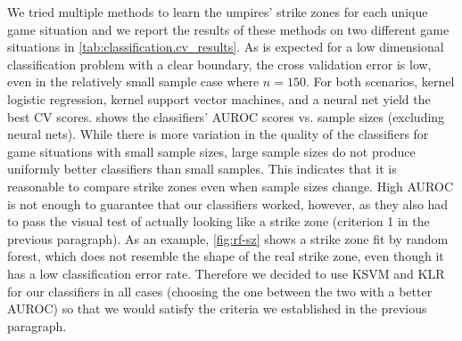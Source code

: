 \documentclass[letterpaper,12pt]{article}
\begin{document}
We tried multiple methods to learn the umpires' strike zones for each unique game situation and we report the results of these methods on two different game situations in \cref{tab:classification.cv_results}.
As is expected for a low dimensional classification problem with a clear boundary, the cross validation error is low, even in the relatively small sample case where $n=150$.
For both scenarios, kernel logistic regression, kernel support vector machines, and a neural net yield the best CV scores. 
 shows the classifiers' AUROC scores vs. sample sizes (excluding neural nets). While there is more variation in the quality of the classifiers for game situations with small sample sizes, large sample sizes do not produce uniformly better classifiers than small samples. This indicates that it is reasonable to compare strike zones even when sample sizes change.
High AUROC is not enough to guarantee that our classifiers worked, however, as they also had to pass the visual test of actually looking like a strike zone (criterion 1 in the previous paragraph). 
As an example, \cref{fig:rf-sz} shows a strike zone fit by random forest, which does not resemble the shape of the real strike zone, even though it has a low classification error rate.
Therefore we decided to use KSVM and KLR for our classifiers in all cases (choosing the one between the two with a better AUROC) so that we would satisfy the criteria we established in the previous paragraph.
\end{document}
